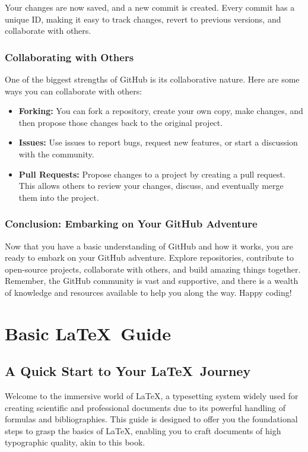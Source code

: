 \documentclass[a4paper,12pt]{book}
\begin{document}
Your changes are now saved, and a new commit is created. Every commit has a unique ID, making it easy to track changes, revert to previous versions, and collaborate with others.

\subsection*{Collaborating with Others}

One of the biggest strengths of GitHub is its collaborative nature. Here are some ways you can collaborate with others:

\begin{itemize}
    \item \textbf{Forking:} You can fork a repository, create your own copy, make changes, and then propose those changes back to the original project.
    \item \textbf{Issues:} Use issues to report bugs, request new features, or start a discussion with the community.
    \item \textbf{Pull Requests:} Propose changes to a project by creating a pull request. This allows others to review your changes, discuss, and eventually merge them into the project.
\end{itemize}

\subsection*{Conclusion: Embarking on Your GitHub Adventure}

Now that you have a basic understanding of GitHub and how it works, you are ready to embark on your GitHub adventure. Explore repositories, contribute to open-source projects, collaborate with others, and build amazing things together. Remember, the GitHub community is vast and supportive, and there is a wealth of knowledge and resources available to help you along the way. Happy coding!

\chapter{Basic \LaTeX\ Guide}
\section*{A Quick Start to Your \LaTeX\ Journey}

Welcome to the immersive world of \LaTeX, a typesetting system widely used for creating scientific and professional documents due to its powerful handling of formulas and bibliographies. This guide is designed to offer you the foundational steps to grasp the basics of \LaTeX, enabling you to craft documents of high typographic quality, akin to this book.
\end{document}
